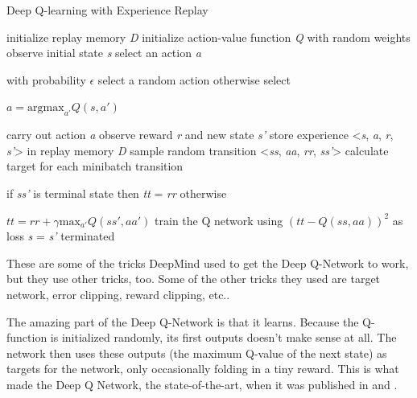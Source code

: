 \begin{algorithm}
	\caption{Deep Q-learning with Experience Replay}
	\label{algo:DQN}
	\begin{algorithmic}[]
		\State initialize replay memory \textit{D}
		\State initialize action-value function \textit{Q} with random weights
		\State observe initial state \textit{s} 
		\Repeat
			\State select an action \textit{a}
				\par with probability $\epsilon$ select a random action otherwise select 
				\par $a = \mathrm{argmax}_{a'}Q(s,a')$
		
			\State carry out action \textit{a}
			\State observe reward \textit{r} and new state \textit{s'}
			\State store experience <\textit{s}, \textit{a}, \textit{r}, \textit{s'}> in replay memory \textit{D}
			\newline
			\State sample random transition <\textit{ss}, \textit{aa}, \textit{rr}, \textit{ss'}>      
			\State calculate target for each minibatch transition
				\par if \textit{ss'} is terminal state then \textit{tt} = \textit{rr} otherwise 
				\par $tt = rr + \gamma \mathrm{max}_{a'}Q(ss',aa')$
			\State train the Q network using $(\textit{tt} - Q(\textit{ss}, \textit{aa}))^2$ as loss	
			\newline
			\State \textit{s} = \textit{s'}
		\Until terminated
	\end{algorithmic}
\end{algorithm}

These are some of the tricks DeepMind used to get the Deep Q-Network to work, but they use other tricks, too. Some of the other tricks they used are target network, error clipping, reward clipping, etc.. 

The amazing part of the Deep Q-Network is that it learns. Because the Q-function is initialized randomly, its first outputs doesn't make sense at all. The network then uses these outputs (the maximum Q-value of the next state) as targets for the network, only occasionally folding in a tiny reward. This is what made the Deep Q Network, the state-of-the-art, when it was published in \cite{DQN_theory} and \cite{DQN_Flappy}.
        